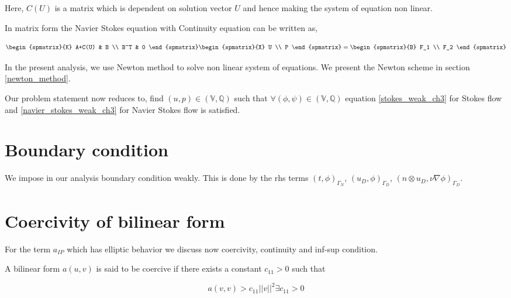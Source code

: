 \documentclass[a4paper,12pt]{book}
\begin{document}
Here, $C(U)$ is a matrix which is dependent on solution vector $U$ and hence making the system of equation non linear.

In matrix form the Navier Stokes equation with Continuity equation can be written as,

\begin{equation} \label{Stokes_matrix_ch3}
\begin{spmatrix}{K}
    A+C(U) & B \\
    B^T & 0
\end{spmatrix}
\begin{spmatrix}{X}
    U \\
    P
\end{spmatrix}
=
\begin{spmatrix}{B}
    F_1  \\
    F_2
\end{spmatrix}
\end{equation}

In the present analysis, we use Newton method to solve non linear system of equations. We present the Newton scheme in section \ref{newton_method}. 

Our problem statement now reduces to, find $(u,p) \in (\mathbb{V},\mathbb{Q})$ such that $\forall (\phi,\psi) \in (\mathbb{V},\mathbb{Q})$ equation \ref{stokes_weak_ch3} for Stokes flow and \ref{navier_stokes_weak_ch3} for Navier Stokes flow is satisfied.

\section{Boundary condition}

We impose in our analysis boundary condition weakly. This is done by the rhs terms $(t,\phi)_{\Gamma_N}$, $(u_D,\phi)_{\Gamma_D}$, $(n \otimes u_D, \nu \nabla \phi)_{\Gamma_D}$.

\section{Coercivity of bilinear form} 

For the term $a_{IP}$ which has elliptic behavior we discuss now coercivity, continuity and inf-sup condition\cite{riviere}.

A bilinear form $a(u,v)$ is said to be coercive if there exists a constant $c_{11} > 0$ such that

\begin{equation}\label{Coercivity}
a(v,v) > c_{11} ||v||^2   \exists   c_{11} > 0
\end{equation}
\end{document}
